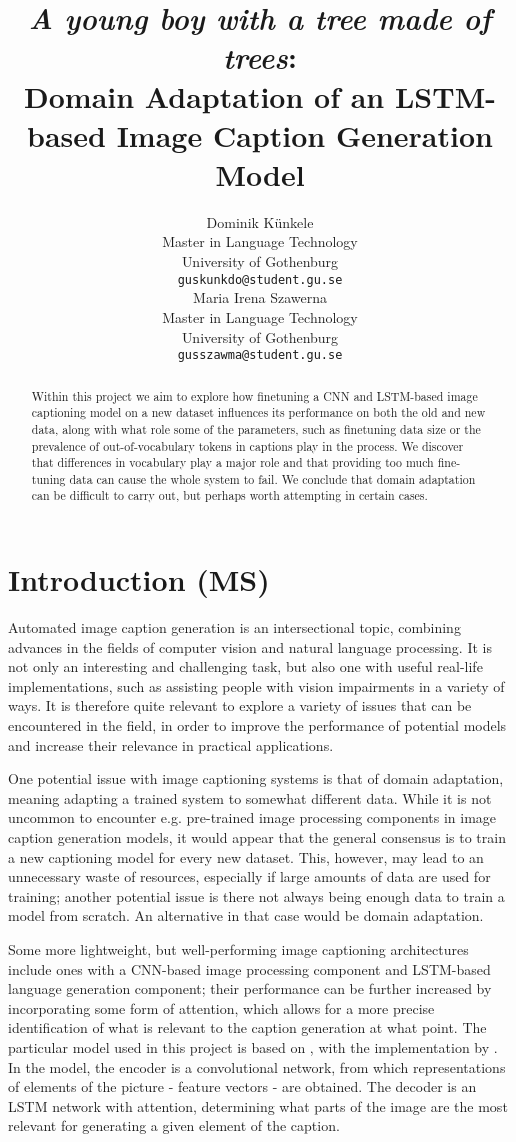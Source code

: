 \documentclass[11pt]{article}
\title{\textit{A young boy with a tree made of trees}: \\ Domain Adaptation of an LSTM-based Image Caption Generation Model}
\author{Dominik Künkele \\
  Master in Language Technology \\
  University of Gothenburg \\
  \texttt{guskunkdo@student.gu.se} \\\And
  Maria Irena Szawerna \\
  Master in Language Technology \\
  University of Gothenburg \\
  \texttt{gusszawma@student.gu.se} \\}
\begin{document}
\maketitle
\begin{abstract}

Within this project we aim to explore how finetuning a CNN and LSTM-based image captioning model on a new dataset influences its performance on both the old and new data, along with what role some of the parameters, such as finetuning data size or the prevalence of out-of-vocabulary tokens in captions play in the process. We discover that differences in vocabulary play a major role and that providing too much fine-tuning data can cause the whole system to fail. We conclude that domain adaptation can be difficult to carry out, but perhaps worth attempting in certain cases.

\end{abstract}

\section{Introduction (MS)}

Automated image caption generation is an intersectional topic, combining advances in the fields of computer vision and natural language processing. It is not only an interesting and challenging task, but also one with useful real-life implementations, such as assisting people with vision impairments in a variety of ways. It is therefore quite relevant to explore a variety of issues that can be encountered in the field, in order to improve the performance of potential models and increase their relevance in practical applications.

One potential issue with image captioning systems is that of domain adaptation, meaning adapting a trained system to somewhat different data. While it is not uncommon to encounter e.g. pre-trained image processing components in image caption generation models, it would appear that the general consensus is to train a new captioning model for every new dataset. This, however, may lead to an unnecessary waste of resources, especially if large amounts of data are used for training; another potential issue is there not always being enough data to train a model from scratch. An alternative in that case would be domain adaptation.

Some more lightweight, but well-performing image captioning architectures include ones with a CNN-based image processing component and LSTM-based language generation component; their performance can be further increased by incorporating some form of attention, which allows for a more precise identification of what is relevant to the caption generation at what point. The particular model used in this project is based on \cite{xu2015attend}, with the implementation by \cite{ilinykh}. In the model, the encoder is a convolutional network, from which representations of elements of the picture - feature vectors - are obtained. The decoder is an LSTM network with attention, determining what parts of the image are the most relevant for generating a given element of the caption.
\end{document}
